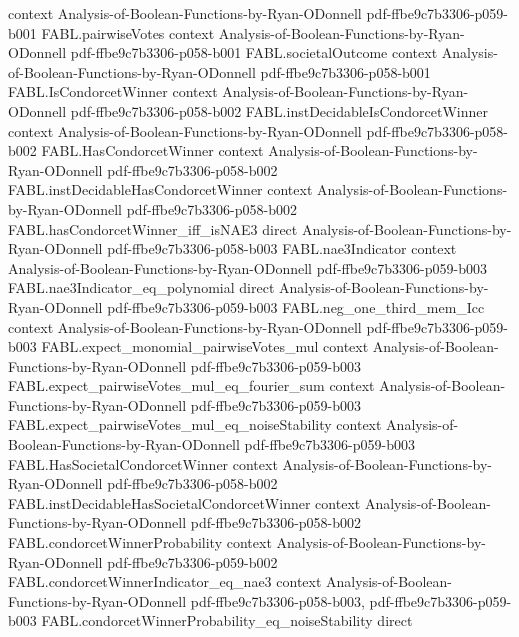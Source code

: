 \begin{theorem}
  {context}
  {Analysis-of-Boolean-Functions-by-Ryan-ODonnell}
  {pdf-ffbe9c7b3306-p059-b001}
\proofstep
  {FABL.pairwiseVotes}
  {context}
  {Analysis-of-Boolean-Functions-by-Ryan-ODonnell}
  {pdf-ffbe9c7b3306-p058-b001}
\proofstep
  {FABL.societalOutcome}
  {context}
  {Analysis-of-Boolean-Functions-by-Ryan-ODonnell}
  {pdf-ffbe9c7b3306-p058-b001}
\proofstep
  {FABL.IsCondorcetWinner}
  {context}
  {Analysis-of-Boolean-Functions-by-Ryan-ODonnell}
  {pdf-ffbe9c7b3306-p058-b002}
\proofstep
  {FABL.instDecidableIsCondorcetWinner}
  {context}
  {Analysis-of-Boolean-Functions-by-Ryan-ODonnell}
  {pdf-ffbe9c7b3306-p058-b002}
\proofstep
  {FABL.HasCondorcetWinner}
  {context}
  {Analysis-of-Boolean-Functions-by-Ryan-ODonnell}
  {pdf-ffbe9c7b3306-p058-b002}
\proofstep
  {FABL.instDecidableHasCondorcetWinner}
  {context}
  {Analysis-of-Boolean-Functions-by-Ryan-ODonnell}
  {pdf-ffbe9c7b3306-p058-b002}
\proofstep
  {FABL.hasCondorcetWinner_iff_isNAE3}
  {direct}
  {Analysis-of-Boolean-Functions-by-Ryan-ODonnell}
  {pdf-ffbe9c7b3306-p058-b003}
\proofstep
  {FABL.nae3Indicator}
  {context}
  {Analysis-of-Boolean-Functions-by-Ryan-ODonnell}
  {pdf-ffbe9c7b3306-p059-b003}
\proofstep
  {FABL.nae3Indicator_eq_polynomial}
  {direct}
  {Analysis-of-Boolean-Functions-by-Ryan-ODonnell}
  {pdf-ffbe9c7b3306-p059-b003}
\proofstep
  {FABL.neg_one_third_mem_Icc}
  {context}
  {Analysis-of-Boolean-Functions-by-Ryan-ODonnell}
  {pdf-ffbe9c7b3306-p059-b003}
\proofstep
  {FABL.expect_monomial_pairwiseVotes_mul}
  {context}
  {Analysis-of-Boolean-Functions-by-Ryan-ODonnell}
  {pdf-ffbe9c7b3306-p059-b003}
\proofstep
  {FABL.expect_pairwiseVotes_mul_eq_fourier_sum}
  {context}
  {Analysis-of-Boolean-Functions-by-Ryan-ODonnell}
  {pdf-ffbe9c7b3306-p059-b003}
\proofstep
  {FABL.expect_pairwiseVotes_mul_eq_noiseStability}
  {context}
  {Analysis-of-Boolean-Functions-by-Ryan-ODonnell}
  {pdf-ffbe9c7b3306-p059-b003}
\proofstep
  {FABL.HasSocietalCondorcetWinner}
  {context}
  {Analysis-of-Boolean-Functions-by-Ryan-ODonnell}
  {pdf-ffbe9c7b3306-p058-b002}
\proofstep
  {FABL.instDecidableHasSocietalCondorcetWinner}
  {context}
  {Analysis-of-Boolean-Functions-by-Ryan-ODonnell}
  {pdf-ffbe9c7b3306-p058-b002}
\proofstep
  {FABL.condorcetWinnerProbability}
  {context}
  {Analysis-of-Boolean-Functions-by-Ryan-ODonnell}
  {pdf-ffbe9c7b3306-p059-b002}
\proofstep
  {FABL.condorcetWinnerIndicator_eq_nae3}
  {context}
  {Analysis-of-Boolean-Functions-by-Ryan-ODonnell}
  {pdf-ffbe9c7b3306-p058-b003,
    pdf-ffbe9c7b3306-p059-b003}
\proofstep
  {FABL.condorcetWinnerProbability_eq_noiseStability}
  {direct}

\end{theorem}

